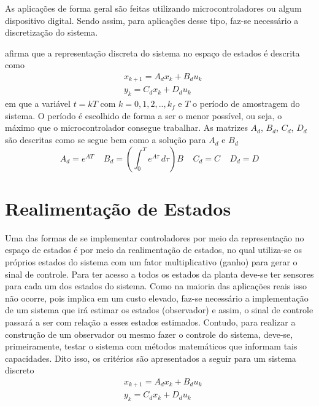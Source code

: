 As aplicações de forma geral são feitas utilizando microcontroladores ou algum dispositivo digital. Sendo assim, para aplicações desse tipo, faz-se necessário a discretização do sistema. 

\cite{Chen} afirma que a representação discreta do sistema no espaço de estados é descrita como
\begin{equation}
    \begin{array}{cc} \label{eq:SSDiscretoLTI}
         & x_{k+1} = A_dx_k + B_du_k \\[6pt]
         & y_k = C_dx_k + D_du_k
    \end{array}{}
\end{equation}{}
em que a variável $t=kT$ com $k=0,1,2,..,k_f$ e $T$ o período de amostragem do sistema. O período é escolhido de forma a ser o menor possível, ou seja, o máximo que o microcontrolador consegue trabalhar. As matrizes $A_d$, $B_d$, $C_d$, $D_d$ são descritas como se segue bem como a solução para $A_d$ e $B_d$ \citep[p. 91]{Chen}
\begin{equation}\label{eq:MetodoDiscretizacao}
    A_d = e^{AT} ~~~~~ B_d = \left(\int_{0}^{T} e^{A\tau} \, d\tau\right)B~~~~~  C_d = C ~~~~~ D_d = D    
\end{equation}


\section{Realimentação de Estados}

Uma das formas de se implementar controladores por meio da representação no espaço de estados é por meio da realimentação de estados, no qual utiliza-se os próprios estados do sistema com um fator multiplicativo (ganho) para gerar o sinal de controle. Para ter acesso a todos os estados da planta deve-se ter sensores para cada um dos estados do sistema. Como na maioria das aplicações reais isso não ocorre, pois implica em um custo elevado, faz-se necessário a implementação de um sistema que irá estimar os estados (observador) e assim, o sinal de controle passará a ser com relação a esses estados estimados. Contudo, para realizar a construção de um observador ou mesmo fazer o controle do sistema, deve-se, primeiramente, testar o sistema com métodos matemáticos que informam tais capacidades. Dito isso, os critérios são apresentados a seguir para um sistema discreto
\begin{equation}\label{eq:SSDiscretoLTI2}
    \begin{array}{cc}
         &  x_{k+1} = A_dx_k + B_du_k \\[10pt]
         &  y_k = C_dx_k + D_du_k
    \end{array}{}
\end{equation}{}

